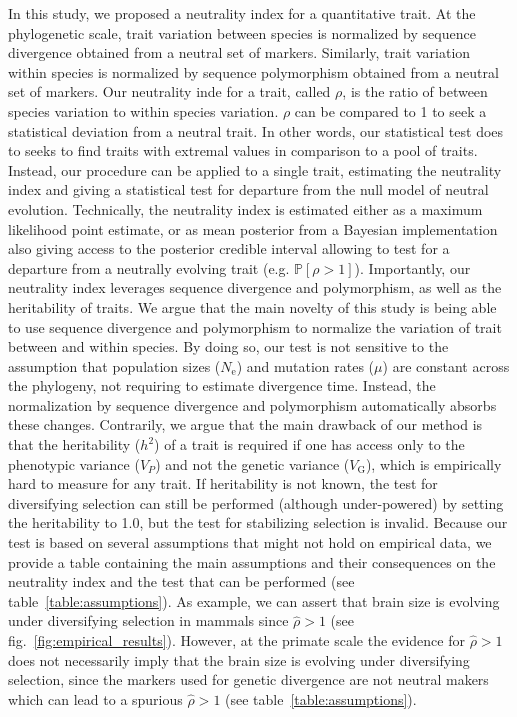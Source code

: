 \documentclass{article}
\newcommand{\Ne}{N_{\text{e}}}
\newcommand{\proba}{\mathbb{P}}
\newcommand{\Trait}{P}
\newcommand{\Heredity}{h^2}
\newcommand{\MutationRate}{\mu}
\newcommand{\VarPhenotype}{V_{\Trait}}
\newcommand{\VarGenetic}{V_{\mathrm{G}}}
\newcommand{\NI}{\rho}
\newcommand{\EstNI}{\widehat{\rho}}
\begin{document}
In this study, we proposed a neutrality index for a quantitative trait.
At the phylogenetic scale, trait variation between species is normalized by sequence divergence obtained from a neutral set of markers.
Similarly, trait variation within species is normalized by sequence polymorphism obtained from a neutral set of markers.
Our neutrality inde for a trait, called $\NI$, is the ratio of between species variation to within species variation.
$\NI$ can be compared to 1 to seek a statistical deviation from a neutral trait.
In other words, our statistical test does to seeks to find traits with extremal values in comparison to a pool of traits.
Instead, our procedure can be applied to a single trait, estimating the neutrality index and giving a statistical test for departure from the null model of neutral evolution.
Technically, the neutrality index is estimated either as a maximum likelihood point estimate, or as mean posterior from a Bayesian implementation also giving access to the posterior credible interval allowing to test for a departure from a neutrally evolving trait (e.g. $ \proba [ \NI > 1 ]$).
Importantly, our neutrality index leverages sequence divergence and polymorphism, as well as the heritability of traits.
We argue that the main novelty of this study is being able to use sequence divergence and polymorphism to normalize the variation of trait between and within species.
By doing so, our test is not sensitive to the assumption that population sizes ($\Ne$) and mutation rates ($\MutationRate$) are constant across the phylogeny, not requiring to estimate divergence time\cite{litsios_effects_2012}.
Instead, the normalization by sequence divergence and polymorphism automatically absorbs these changes\cite{seo_estimating_2004}.
Contrarily, we argue that the main drawback of our method is that the heritability ($\Heredity$) of a trait is required if one has access only to the phenotypic variance ($\VarPhenotype$) and not the genetic variance ($\VarGenetic$), which is empirically hard to measure for any trait.
If heritability is not known, the test for diversifying selection can still be performed (although under-powered) by setting the heritability to 1.0, but the test for stabilizing selection is invalid.
Because our test is based on several assumptions that might not hold on empirical data, we provide a table containing the main assumptions and their consequences on the neutrality index and the test that can be performed (see table~\ref{table:assumptions}).
As example, we can assert that brain size is evolving under diversifying selection in mammals since $\EstNI > 1$ (see fig.~\ref{fig:empirical_results}).
However, at the primate scale the evidence for $\EstNI > 1$ does not necessarily imply that the brain size is evolving under diversifying selection, since the markers used for genetic divergence are not neutral makers which can lead to a spurious $\EstNI > 1$ (see table~\ref{table:assumptions}).
\end{document}
